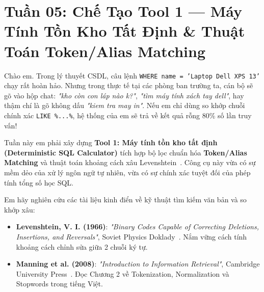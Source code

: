 \section{Tuần 05: Chế Tạo Tool 1 — Máy Tính Tồn Kho Tất Định \& Thuật Toán Token/Alias Matching}
\label{sec:tuan_05}

\begin{advisorbox}
Chào em. Trong lý thuyết CSDL, câu lệnh \texttt{WHERE name = 'Laptop Dell XPS 13'} chạy rất hoàn hảo. Nhưng trong thực tế tại các phòng ban trường ta, cán bộ sẽ gõ vào hộp chat: \textit{"kho còn con láp nào k?"}, \textit{"tìm máy tính xách tay dell"}, hay thậm chí là gõ không dấu \textit{"kiem tra may in"}. Nếu em chỉ dùng so khớp chuỗi chính xác \texttt{LIKE \%...\%}, hệ thống của em sẽ trả về kết quả rỗng 80\% số lần truy vấn!

Tuần này em phải xây dựng \textbf{Tool 1: Máy tính tồn kho tất định (Deterministic SQL Calculator)} tích hợp bộ lọc chuẩn hóa \textbf{Token/Alias Matching} và thuật toán khoảng cách xâu Levenshtein~\cite{levenshtein1966binary}. Công cụ này vừa có sự mềm dẻo của xử lý ngôn ngữ tự nhiên, vừa có sự chính xác tuyệt đối của phép tính tổng số học SQL.
\end{advisorbox}

\begin{literaturebox}
Em hãy nghiên cứu các tài liệu kinh điển về kỹ thuật tìm kiếm văn bản và so khớp xâu:
\begin{itemize}[leftmargin=1.5em]
    \item \textbf{Levenshtein, V. I. (1966)}: \textit{"Binary Codes Capable of Correcting Deletions, Insertions, and Reversals"}, Soviet Physics Doklady~\cite{levenshtein1966binary}. Nắm vững cách tính khoảng cách chỉnh sửa giữa 2 chuỗi ký tự.
    \item \textbf{Manning et al. (2008)}: \textit{"Introduction to Information Retrieval"}, Cambridge University Press~\cite{manning2008introduction}. Đọc Chương 2 về Tokenization, Normalization và Stopwords trong tiếng Việt.
\end{itemize}
\end{literaturebox}

